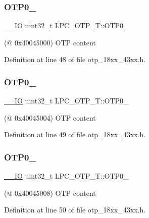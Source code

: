 \subsubsection{\texorpdfstring{O\+T\+P0\+\_}{OTP0\_0}}
{\footnotesize\ttfamily \hyperlink{core__sc300_8h_aec43007d9998a0a0e01faede4133d6be}{\+\_\+\+\_\+\+IO} uint32\+\_\+t L\+P\+C\+\_\+\+O\+T\+P\+\_\+\+T\+::\+O\+T\+P0\+\_}

(@ 0x40045000) O\+TP content 

Definition at line 48 of file otp\+\_\+18xx\+\_\+43xx.\+h.

\mbox{\label{struct_l_p_c___o_t_p___t_a52c39e4d22329afd63902bd189be47f8}} 
\subsubsection{\texorpdfstring{O\+T\+P0\+\_}{OTP0\_1}}
{\footnotesize\ttfamily \hyperlink{core__sc300_8h_aec43007d9998a0a0e01faede4133d6be}{\+\_\+\+\_\+\+IO} uint32\+\_\+t L\+P\+C\+\_\+\+O\+T\+P\+\_\+\+T\+::\+O\+T\+P0\+\_}

(@ 0x40045004) O\+TP content 

Definition at line 49 of file otp\+\_\+18xx\+\_\+43xx.\+h.

\mbox{\label{struct_l_p_c___o_t_p___t_a968a5ebe7867b0c136c680de92e6c683}} 
\subsubsection{\texorpdfstring{O\+T\+P0\+\_}{OTP0\_2}}
{\footnotesize\ttfamily \hyperlink{core__sc300_8h_aec43007d9998a0a0e01faede4133d6be}{\+\_\+\+\_\+\+IO} uint32\+\_\+t L\+P\+C\+\_\+\+O\+T\+P\+\_\+\+T\+::\+O\+T\+P0\+\_}

(@ 0x40045008) O\+TP content 

Definition at line 50 of file otp\+\_\+18xx\+\_\+43xx.\+h.

\mbox{\label{struct_l_p_c___o_t_p___t_a50ce87e9b59f0ab895c09cd06f2700c6}} 
